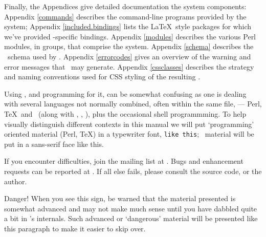 \documentclass{book}
\begin{document}
Finally, the Appendices give detailed documentation the system components:
Appendix \ref{commands} describes the command-line programs provided by the system;
Appendix \ref{included.bindings} lists the \LaTeX\ style packages for which
we've provided \LaTeXML-specific bindings.
Appendix \ref{modules}
describes the various Perl modules, in groups, that comprise the system.
Appendix \ref{schema} describes the \XML\ schema used by \LaTeXML.
Appendix \ref{errorcodes} gives an overview of the warning and
error messages that \LaTeXML\ may generate.
Appendix \ref{cssclasses} describes the strategy and naming conventions
used for CSS styling of the resulting \HTML.

Using \LaTeXML, and programming for it, can be somewhat confusing as one is dealing with several
languages not normally combined, often within the same file,
--- Perl, \TeX\ and \XML\ (along with \XSLT, \HTML, \CSS),
plus the occasional shell programmming.
To help visually distinguish different contexts in this manual
we will put `programming' oriented material (Perl, \TeX) in a typewriter font,
\texttt{like this}; \XML\ material will be put in a sans-serif face
\textsf{like this}.

\vskip 1cm\relax
If you encounter difficulties, join the mailing list at
.
Bugs and enhancement requests can be reported at
.
If all else fails, please consult the source code, or the author.

\begin{advanced}
Danger! When you see this sign, be warned that the material presented is
somewhat advanced and may not make much sense until you have dabbled quite
a bit in \LaTeXML's internals.
Such advanced or `dangerous' material will be presented like this paragraph
to make it easier to skip over.
\end{advanced}

\end{document}

